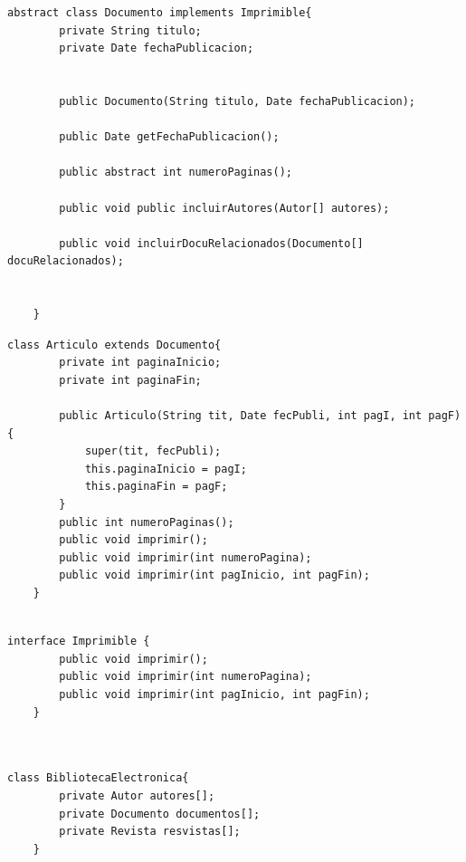 \documentclass[a4paper,12pt]{article}
\begin{document}
\begin{lstlisting}[style=customjava, caption={lase Documento (cabecera, atributos y cabeceras de los métodos)}]
    abstract class Documento implements Imprimible{
        private String titulo;
        private Date fechaPublicacion;


        public Documento(String titulo, Date fechaPublicacion);

        public Date getFechaPublicacion();

        public abstract int numeroPaginas();

        public void public incluirAutores(Autor[] autores);

        public void incluirDocuRelacionados(Documento[] docuRelacionados);


    }

\end{lstlisting}

\begin{lstlisting}[style=customjava, caption={clase Articulo (cabecera, atributos y cabeceras de los métodos), constructor de la clase Artículo}]
    class Articulo extends Documento{
        private int paginaInicio;
        private int paginaFin;

        public Articulo(String tit, Date fecPubli, int pagI, int pagF){
            super(tit, fecPubli);
            this.paginaInicio = pagI;
            this.paginaFin = pagF;
        }
        public int numeroPaginas();
        public void imprimir();
        public void imprimir(int numeroPagina);
        public void imprimir(int pagInicio, int pagFin);
    }
    
\end{lstlisting}

\begin{lstlisting}[style=customjava, caption = {Intefaz Imprimible}]
    interface Imprimible {
        public void imprimir();
        public void imprimir(int numeroPagina);
        public void imprimir(int pagInicio, int pagFin);
    }



\end{lstlisting}

\begin{lstlisting}[style = customjava, caption = {Atributos que definen el estado de la clase BibliotecaElectronica}]
    class BibliotecaElectronica{
        private Autor autores[];
        private Documento documentos[];
        private Revista resvistas[];
    }
\end{lstlisting}
\end{document}
